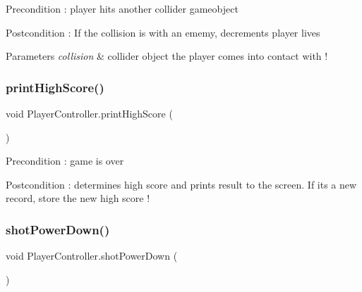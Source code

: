 \begin{DoxyPrecond}{Precondition}
\+: player hits another collider gameobject 
\end{DoxyPrecond}
\begin{DoxyPostcond}{Postcondition}
\+: If the collision is with an ememy, decrements player lives 
\end{DoxyPostcond}

\begin{DoxyParams}{Parameters}
{\em collision} & collider object the player comes into contact with ! \\
\hline
\end{DoxyParams}
\mbox{\label{class_player_controller_a685b3e7478ec3431f858455832c45527}} 
\subsubsection{\texorpdfstring{printHighScore()}{printHighScore()}}
{\footnotesize\ttfamily void Player\+Controller.\+print\+High\+Score (\begin{DoxyParamCaption}{ }\end{DoxyParamCaption})}

\begin{DoxyPrecond}{Precondition}
\+: game is over 
\end{DoxyPrecond}
\begin{DoxyPostcond}{Postcondition}
\+: determines high score and prints result to the screen. If it\textquotesingle{}s a new record, store the new high score ! 
\end{DoxyPostcond}
\mbox{\label{class_player_controller_a5d6e6be056b9cc9f2db7195e633bdd4c}} 
\subsubsection{\texorpdfstring{shotPowerDown()}{shotPowerDown()}}
{\footnotesize\ttfamily void Player\+Controller.\+shot\+Power\+Down (\begin{DoxyParamCaption}{ }\end{DoxyParamCaption})}

